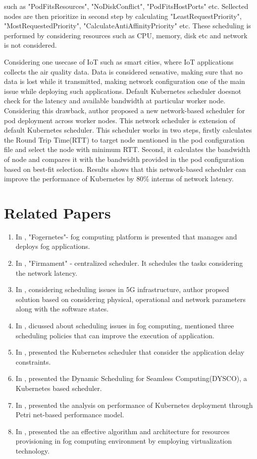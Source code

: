 \documentclass[12pt,twoside,doublepage]{article}
\begin{document}
such as "PodFitsResources", "NoDiskConflict", "PodFitsHostPorts" etc. Sellected nodes are then prioritize
in second step by calculating "LeastRequestPriority", "MostRequestedPriority", "CalculateAntiAffinityPriority"
etc. These scheduling is performed by considering resources such as CPU, memory, disk etc and network is not
considered.
\par
Considering one usecase of IoT such as smart cities, where IoT applications collects the air quality data. Data is
considered sensative, making sure that no data is lost while it transmitted, making network configuration one of the main
issue while deploying such applications. Default Kubernetes scheduler doesnot check for the latency and available bandwidth
at particular worker node. Considering this drawback, author proposed a new network-based scheduler for pod deployment
across worker nodes. This network scheduler is extension of default Kubernetes scheduler. This scheduler works
in two steps, firstly calculates the Round Trip Time(RTT) to target node mentioned in the pod configuration file
and select the node with minimum RTT. Second, it calculates the bandwidth of node and compares it with the bandwidth
provided in the pod configuration based on best-fit selection. Results shows that this network-based scheduler can
improve the performance of Kubernetes by 80\% interms of network latency\cite{Santos2019}.

\section{Related Papers}
\label{sec:relwork}
\begin{enumerate}
  \item In \cite{Wobker2018}, "Fogernetes"- fog computing platform is presented that manages and deploys fog applications.
  \item In \cite{gog}, "Firmament" - centralized scheduler. It schedules the tasks considering the network latency.
  \item In \cite{MichaelChimaOgbuachiAnnaRealePeterSuskovics}, considering scheduling issues in 5G infrastructure, author
  propsed solution based on considering physical, operational and network parameters along with the software states.
  \item In \cite{Bittencourt2017}, dicussed about scheduling issues in fog computing, mentioned three scheduling policies
  that can improve the execution of application.
  \item In \cite{Haja2019}, presented the Kubernetes scheduler that consider the application delay constraints.
  \item In \cite{Mittermeier2018}, presented the Dynamic Scheduling for Seamless Computing(DYSCO), a Kubernetes based scheduler.
  \item In \cite{Medel2018}, presented the analysis on performance of Kubernetes deployment through Petri net-based performance model.
  \item In \cite{Agarwal2016}, presented the  an effective algorithm and architecture for resources provisioning in fog computing
  environment by employing virtualization technology.
\end{enumerate}
\end{document}
